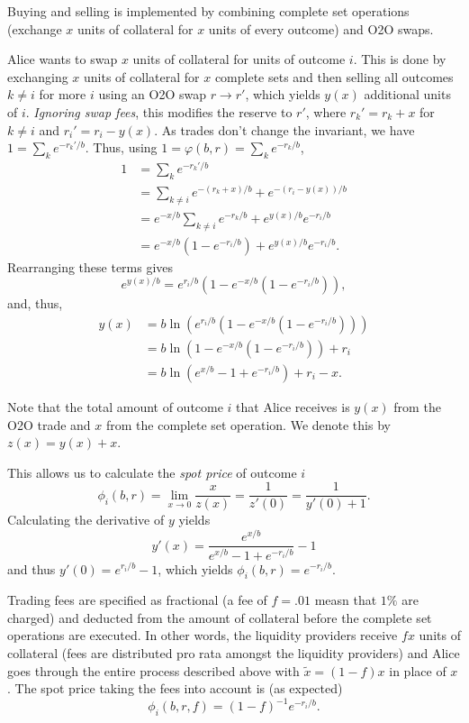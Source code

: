 \documentclass[12pt]{article}
\begin{document}
Buying and selling is implemented by combining complete set operations (exchange $x$ units of collateral for $x$ units of every outcome) and O2O swaps.

Alice wants to swap $x$ units of collateral for units of outcome $i$. This is done by exchanging $x$ units of collateral for $x$ complete sets and then selling all outcomes $k \neq i$ for more $i$ using an O2O swap $r \rightarrow r'$, which yields $y(x)$ additional units of $i$. \emph{Ignoring swap fees}, this modifies the reserve to $r'$, where $r_k' = r_k + x$ for $k \neq i$ and $r_i' = r_i - y(x)$. As trades don't change the invariant, we have $1 = \sum_k e^{-r_k'/b}$. Thus, using $1 = \varphi(b, r) = \sum_k e^{-r_k/b}$,
\begin{align*}
    1 &= \sum_k e^{-r_k'/b} \\
    &= \sum_{k \neq i} e^{-(r_k + x)/b} + e^{-(r_i-y(x))/b} \\
    &= e^{-x/b} \sum_{k \neq i} e^{-r_k/b} + e^{y(x)/b} e^{-r_i/b} \\
    &= e^{-x/b} (1 - e^{-r_i/b}) + e^{y(x)/b} e^{-r_i/b}.
\end{align*}
Rearranging these terms gives
\[
    e^{y(x)/b} = e^{r_i/b} (1 - e^{-x/b}(1 - e^{-r_i/b})),
\]
and, thus,
\begin{align*}
    y(x) &= b \ln(e^{r_i/b} (1 - e^{-x/b}(1 - e^{-r_i/b}))) \\
    &= b \ln (1 - e^{-x/b}(1 - e^{-r_i/b})) + r_i \\
    &= b \ln (e^{x/b} - 1 + e^{-r_i/b}) + r_i - x.
\end{align*}

Note that the total amount of outcome $i$ that Alice receives is $y(x)$ from the O2O trade and $x$ from the complete set operation. We denote this by $z(x) = y(x) + x$.

This allows us to calculate the \emph{spot price} of outcome $i$ 
\[
    \phi_i(b, r) = \lim_{x \rightarrow 0} \frac{x}{z(x)} = \frac{1}{z'(0)} = \frac{1}{y'(0) + 1}.
\]
Calculating the derivative of $y$ yields
\[
    y'(x) = \frac{e^{x/b}}{e^{x/b} - 1 + e^{-r_i/b}} - 1
\]
and thus $y'(0) = e^{r_i/b} - 1$, which yields $\phi_i(b, r) = e^{-r_i/b}$.

Trading fees are specified as fractional (a fee of $f = .01$ measn that $1\%$ are charged) and deducted from the amount of collateral before the complete set operations are executed. In other words, the liquidity providers receive $fx$ units of collateral (fees are distributed pro rata amongst the liquidity providers) and Alice goes through the entire process described above with $\tilde x = (1-f)x$ in place of $x$. The spot price taking the fees into account is (as expected)
\[
    \phi_i(b, r, f) = (1 - f)^{-1}e^{-r_i/b}.
\]
\end{document}
